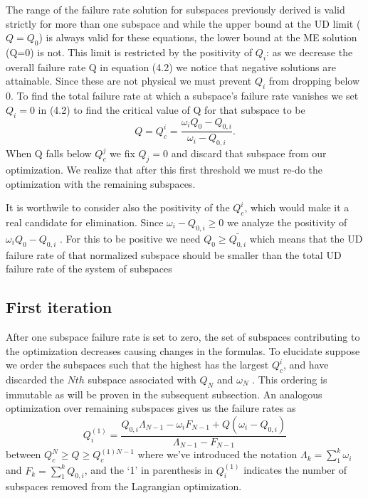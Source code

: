 \documentclass[12pt,oneside,english,reqno]{amsbook}
\numberwithin{section}{chapter}
\numberwithin{equation}{section}
\numberwithin{figure}{section}
\begin{document}
The range of the failure rate solution for subspaces previously derived is valid strictly for more than one subspace and while the upper bound at the UD limit ($Q= Q_0$) is always valid for these equations, the lower bound at the ME solution (Q=0) is not. This limit is restricted by the positivity of $Q_i$:  as we decrease the overall failure rate Q in equation (4.2) we notice that negative solutions are attainable.  Since these are not physical we must prevent $Q_i$ from dropping below 0.  To find the total failure rate at which a subspace's failure rate vanishes we set $Q_i = 0$ in (4.2) to find the critical value of Q for that subspace to be
\begin{equation}Q= Q^i_c = \frac {\omega_i Q_0 - Q_{0,i}}{\omega_i- Q_{0,i}}.\end{equation} 
When Q falls below $Q^j_c$ we fix $Q_j = 0$ and discard that subspace from our optimization.  We realize that after this first threshold we must re-do the optimization with the remaining subspaces. 

It is worthwile to consider also the positivity of the $Q^i_c$, which would make it a real candidate for elimination.  Since $\omega_i - Q_{0,i} \geq 0$ we analyze the positivity of $\omega_i Q_0 - Q_{0,i}$ . For this to be positive we need  $Q_0 \geq \bar{ Q_{0,i}}$ which means that the UD failure rate of that normalized subspace should be smaller than the total UD failure rate of the system of subspaces


\subsection{First iteration}

 After one subspace failure rate is set to zero, the set of subspaces contributing to the optimization decreases causing changes in the formulas.  To elucidate suppose we order the subspaces such that the highest has the largest $Q^i_c$, and have discarded the $Nth$ subspace associated with $Q_N$ and $\omega_N$ .  This ordering is immutable as will be proven in the subsequent subsection. An analogous optimization over remaining subspaces gives us the failure rates as
\begin{equation}  Q^{(1)}_i = \frac{ Q_{0,i}\Lambda_{N-1}  -  \omega_{i} F_{N-1} + Q( \omega_i - Q_{0,i} ) }{\Lambda_{N-1} - F_{N-1}}\end{equation}
between $Q^N_c \geq Q \geq Q^{(1)N-1}_c$ where we've introduced the notation $\Lambda_k = \sum_1^k \omega_i$ and $F_k = \sum_1^k Q_{0,i}$, and the `1' in parenthesis in $Q^{(1)}_i$ indicates the number of subspaces removed from the Lagrangian optimization.
\end{document}
